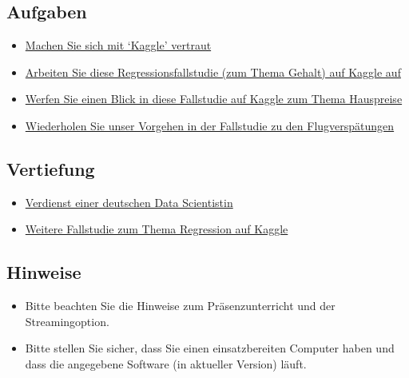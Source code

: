 \documentclass[
]{book}
\providecommand{\tightlist}{%
  \setlength{\itemsep}{0pt}\setlength{\parskip}{0pt}}
\begin{document}
\hypertarget{aufgaben}{%
\subsection{Aufgaben}\label{aufgaben}}

\begin{itemize}
\tightlist
\item
  \href{https://www.kaggle.com/}{Machen Sie sich mit `Kaggle' vertraut}
\item
  \href{https://www.kaggle.com/pranjalpandey12/performing-simple-linear-regression-in-r}{Arbeiten Sie diese Regressionsfallstudie (zum Thema Gehalt) auf Kaggle auf}
\item
  \href{https://www.kaggle.com/lazaro97/data-preprocessing-and-linear-regression-with-r}{Werfen Sie einen Blick in diese Fallstudie auf Kaggle zum Thema Hauspreise}
\item
  \href{https://data-se.netlify.app/2021/03/10/fallstudie-modellierung-von-flugversp\%C3\%A4tungen/}{Wiederholen Sie unser Vorgehen in der Fallstudie zu den Flugverspätungen}
\end{itemize}

\hypertarget{vertiefung}{%
\subsection{Vertiefung}\label{vertiefung}}

\begin{itemize}
\tightlist
\item
  \href{https://www.zeit.de/arbeit/2020-10/data-scientist-gehalt-geldanlage-programmieren-kontoauszug}{Verdienst einer deutschen Data Scientistin}
\item
  \href{https://www.kaggle.com/micahshull/r-bike-sharing-linear-regression}{Weitere Fallstudie zum Thema Regression auf Kaggle}
\end{itemize}

\hypertarget{hinweise}{%
\subsection{Hinweise}\label{hinweise}}

\begin{itemize}
\tightlist
\item
  Bitte beachten Sie die Hinweise zum Präsenzunterricht und der Streamingoption.
\item
  Bitte stellen Sie sicher, dass Sie einen einsatzbereiten Computer haben und dass die angegebene Software (in aktueller Version) läuft.
\end{itemize}
\end{document}
